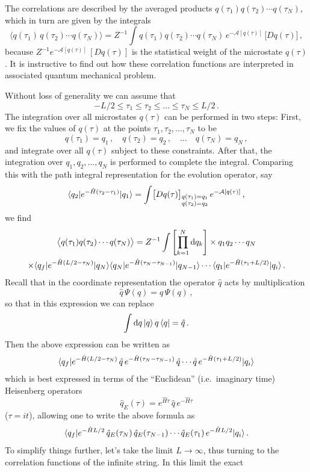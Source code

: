 The correlations are described by the averaged products
$q(\tau_1)q(\tau_2)\cdots q(\tau_N)$, which in turn are given by the integrals
\[
\bigl\langle q(\tau_1)\,q(\tau_2)\cdots q(\tau_N)\bigr\rangle
=Z^{-1}\int q(\tau_1)q(\tau_2)\cdots q(\tau_N)\,e^{-\mathcal A[q(\tau)]}\,\bigl[Dq(\tau)\bigr]\,,
\]
because $Z^{-1}e^{-\mathcal A[q(\tau)]}\,[Dq(\tau)]$ is the statistical
weight of the microstate $q(\tau)$. It is instructive to find out how these
correlation functions are interpreted in associated quantum mechanical
problem.

Without loss of generality we can assume that
\[
-L/2\le\tau_1\le\tau_2\le\dots\le\tau_N\le L/2\,.
\]
The integration over all microstates $q(\tau)$ can be performed in two steps:
First, we fix the values of $q(\tau)$ at the points $\tau_1,\tau_2,\dots,\tau_N$
to be
\[
q(\tau_1)=q_1\,,\quad q(\tau_2)=q_2\,,\quad\dots\quad q(\tau_N)=q_N\,,
\]
and integrate over all $q(\tau)$ subject to these constraints. After that, the
integration over $q_1,q_2,\dots,q_N$ is performed to complete the integral.
Comparing this with the path integral representation for the evolution
operator, say
\[
\langle q_2|e^{-\hat H(\tau_2-\tau_1)}|q_1\rangle=\int\bigl[Dq(\tau)\bigr]_{\substack{q(\tau_1)=q_1\\q(\tau_2)=q_2}}\,e^{-\mathcal A[q(\tau)]}\,,
\]
we find
\begin{multline*}
\bigl\langle q(\tau_1)q(\tau_2)\cdots q(\tau_N)\bigr\rangle=Z^{-1}\int\left[\prod_{k=1}^N\mathop{}\!\mathrm{d} q_k\right]\times q_1q_2\cdots q_N\\
\times\langle q_f|e^{-\hat H(L/2-\tau_N)}|q_N\rangle\langle q_N|e^{-\hat H(\tau_N-\tau_{N-1})}|q_{N-1}\rangle\cdots\langle q_1|e^{-\hat H(\tau_1+L/2)}|q_i\rangle\,.
\end{multline*}
Recall that in the coordinate representation the operator $\hat q$ acts by
multiplication
\[
\hat q\,\Psi(q)=q\,\Psi(q)\,,
\]
so that in this expression we can replace
\[
\int \mathop{}\!\mathrm{d} q\,|q\rangle\,q\,\langle q|=\hat q\,.
\]
Then the above expression can be written as
\[
\langle q_f|e^{-\hat H(L/2-\tau_N)}\,\hat q\,e^{-\hat H(\tau_N-\tau_{N-1})}\,\hat q\cdots\hat q\,e^{-\hat H(\tau_1+L/2)}|q_i\rangle
\]
which is best expressed in terms of the ``Euclidean'' (i.e.\ imaginary time)
Heisenberg operators
\[
\hat q_E(\tau)=e^{\hat H\tau}\,\hat q\,e^{-\hat H\tau}
\]
($\tau=it$), allowing one to write the above formula as
\[
\langle q_f|e^{-\hat HL/2}\,\hat q_E(\tau_N)\,\hat q_E(\tau_{N-1})\cdots\hat q_E(\tau_1)\,e^{-\hat HL/2}|q_i\rangle\,.
\]
To simplify things further, let's take the limit $L\to\infty$, thus turning to
the correlation functions of the infinite string. In this limit the exact
